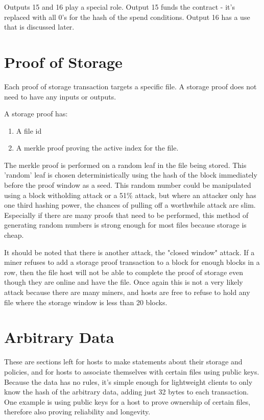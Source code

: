 \documentclass[twocolumn]{article}
\begin{document}
Outputs 15 and 16 play a special role.
Output 15 funds the contract - it's replaced with all 0's for the hash of the spend conditions.
Output 16 has a use that is discussed later.


\section{Proof of Storage}
Each proof of storage transaction targets a specific file.
A storage proof does not need to have any inputs or outputs.

A storage proof has:
\begin{enumerate}
	\item A file id
	\item A merkle proof proving the active index for the file.
\end{enumerate}

The merkle proof is performed on a random leaf in the file being stored.
This 'random' leaf is chosen deterministically using the hash of the block immediately before the proof window as a seed.
This random number could be manipulated using a block witholding attack or a 51\% attack, but where an attacker only has one third hashing power, the chances of pulling off a worthwhile attack are slim.
Especially if there are many proofs that need to be performed, this method of generating random numbers is strong enough for most files because storage is cheap.


It should be noted that there is another attack, the "closed window" attack.
If a miner refuses to add a storage proof transaction to a block for enough blocks in a row, then the file host will not be able to complete the proof of storage even though they are online and have the file.
Once again this is not a very likely attack because there are many miners, and hosts are free to refuse to hold any file where the storage window is less than 20 blocks.

\section{Arbitrary Data}
These are sections left for hosts to make statements about their storage and policies, and for hosts to associate themselves with certain files using public keys.
Because the data has no rules, it's simple enough for lightweight clients to only know the hash of the arbitrary data, adding just 32 bytes to each transaction.
One example is using public keys for a host to prove ownership of certain files, therefore also proving reliability and longevity.
\end{document}

